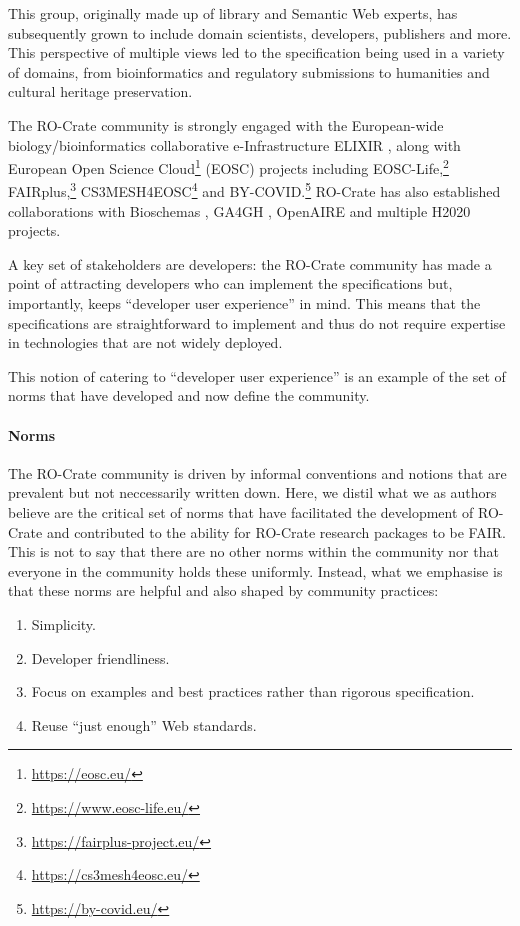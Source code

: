 This group, originally made up of library and Semantic Web experts, has
subsequently grown to include domain scientists, developers, publishers
and more. This perspective of multiple views led to the specification
being used in a variety of domains, from bioinformatics and regulatory
submissions to humanities and cultural heritage preservation.

The RO-Crate community is strongly engaged with the European-wide
biology/bioinformatics collaborative e-Infrastructure ELIXIR
\cite{Crosswell 2012}, along with European Open Science
Cloud\footnote{\url{https://eosc.eu/}} (EOSC) projects including
EOSC-Life,\footnote{\url{https://www.eosc-life.eu/}}
FAIRplus,\footnote{\url{https://fairplus-project.eu/}}
CS3MESH4EOSC\footnote{\url{https://cs3mesh4eosc.eu/}} and
BY-COVID.\footnote{\url{https://by-covid.eu/}} RO-Crate has also established
collaborations with Bioschemas \cite{Gray 2017}, GA4GH
\cite{Rehm 2021}, OpenAIRE \cite{ch5-100}
and multiple H2020 projects.

A key set of stakeholders are developers: the RO-Crate community has
made a point of attracting developers who can implement the
specifications but, importantly, keeps ``developer user experience'' in
mind. This means that the specifications are straightforward to
implement and thus do not require expertise in technologies that are not
widely deployed.

This notion of catering to ``developer user experience'' is an example
of the set of norms that have developed and now define the community.

\paragraph{Norms}\label{ch5:norms}

The RO-Crate community is driven by informal conventions and notions
that are prevalent but not neccessarily written down. Here, we distil
what we as authors believe are the critical set of norms that have
facilitated the development of RO-Crate and contributed to the ability
for RO-Crate research packages to be FAIR. This is not to say that there
are no other norms within the community nor that everyone in the
community holds these uniformly. Instead, what we emphasise is that
these norms are helpful and also shaped by community practices:

\begin{enumerate}
\item
  Simplicity.
\item
  Developer friendliness.
\item
  Focus on examples and best practices rather than rigorous
  specification.
\item
  Reuse ``just enough'' Web standards.
\end{enumerate}

